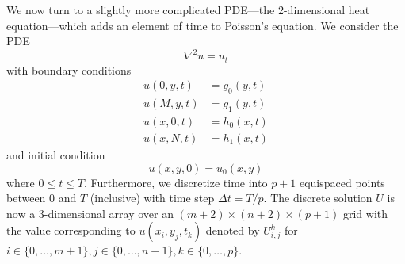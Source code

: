 \documentclass[conference]{IEEEtran}
\begin{document}
We now turn to a slightly more complicated PDE---the 2-dimensional heat equation---which adds an element of time to Poisson's equation. We consider the PDE
\begin{equation}
  \nabla^2 u = u_t
\end{equation}
with boundary conditions
\begin{align}
  u(0, y, t) &= g_0(y, t) \\
  u(M, y, t) &= g_1(y, t) \\
  u(x, 0, t) &= h_0(x, t) \\
  u(x, N, t) &= h_1(x, t)
\end{align}
and initial condition
\begin{equation}
  u(x, y, 0) = u_0(x, y)
\end{equation}
where $0 \le t \le T$. Furthermore, we discretize time into $p+1$ equispaced points between $0$ and $T$ (inclusive) with time step $\Delta t = T/p$. The discrete solution $U$ is now a 3-dimensional array over an $(m+2) \times (n+2) \times (p+1)$ grid with the value corresponding to $u(x_i, y_j, t_k)$ denoted by $U_{i,j}^k$ for $i \in \{0,\ldots,m+1\}, j \in \{0,\ldots,n+1\}, k \in \{0,\ldots,p\}$.
\end{document}
